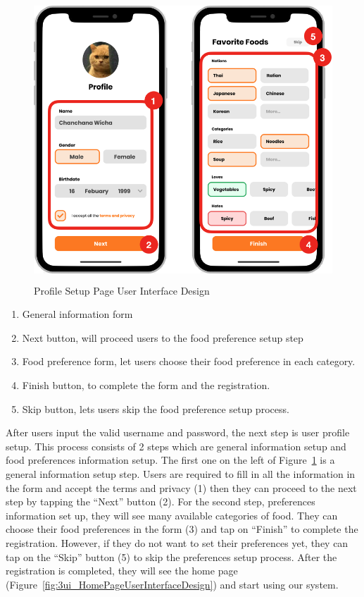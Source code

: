 \documentclass[12pt,oneside,openright,a4paper]{cpe-english-project}
\begin{document}
\newpage
\begin{figure}[H]\centering
\includegraphics[height=300pt]{./images/3ui_ProfileSetupPageUserInterfaceDesign.png}
\caption{Profile Setup Page User Interface Design}\label{fig:3ui_ProfileSetupPageUserInterfaceDesign}
\end{figure}\vspace{-24pt}

\begin{enumerate}
\item General information form
\item Next button, will proceed users to the food preference setup step
\item Food preference form, let users choose their food preference in each category.
\item Finish button, to complete the form and the registration.
\item Skip button, lets users skip the food preference setup process.
\end{enumerate}

After users input the valid username and password, the next step is user profile setup. This process consists of 2 steps which are general information setup and food preferences information setup. The first one on the left of Figure~\ref{fig:3ui_ProfileSetupPageUserInterfaceDesign} is a general information setup step. Users are required to fill in all the information in the form and accept the terms and privacy (1) then they can proceed to the next step by tapping the “Next” button (2). For the second step, preferences information set up, they will see many available categories of food. They can choose their food preferences in the form (3) and tap on “Finish” to complete the registration. However, if they do not want to set their preferences yet, they can tap on the “Skip” button (5) to skip the preferences setup process. After the registration is completed, they will see the home page (Figure~\ref{fig:3ui_HomePageUserInterfaceDesign}) and start using our system.
\end{document}

